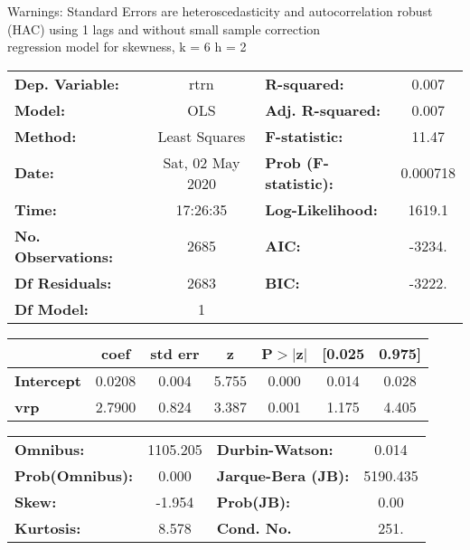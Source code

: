 Warnings: \newline
 [1] Standard Errors are heteroscedasticity and autocorrelation robust (HAC) using 1 lags and without small sample correction\\ 

regression model for skewness, k = 6 h = 2\begin{center}
\begin{tabular}{lclc}
\toprule
\textbf{Dep. Variable:}    &       rtrn       & \textbf{  R-squared:         } &     0.007   \\
\textbf{Model:}            &       OLS        & \textbf{  Adj. R-squared:    } &     0.007   \\
\textbf{Method:}           &  Least Squares   & \textbf{  F-statistic:       } &     11.47   \\
\textbf{Date:}             & Sat, 02 May 2020 & \textbf{  Prob (F-statistic):} &  0.000718   \\
\textbf{Time:}             &     17:26:35     & \textbf{  Log-Likelihood:    } &    1619.1   \\
\textbf{No. Observations:} &        2685      & \textbf{  AIC:               } &    -3234.   \\
\textbf{Df Residuals:}     &        2683      & \textbf{  BIC:               } &    -3222.   \\
\textbf{Df Model:}         &           1      & \textbf{                     } &             \\
\bottomrule
\end{tabular}
\begin{tabular}{lcccccc}
                   & \textbf{coef} & \textbf{std err} & \textbf{z} & \textbf{P$> |$z$|$} & \textbf{[0.025} & \textbf{0.975]}  \\
\midrule
\textbf{Intercept} &       0.0208  &        0.004     &     5.755  &         0.000        &        0.014    &        0.028     \\
\textbf{vrp}       &       2.7900  &        0.824     &     3.387  &         0.001        &        1.175    &        4.405     \\
\bottomrule
\end{tabular}
\begin{tabular}{lclc}
\textbf{Omnibus:}       & 1105.205 & \textbf{  Durbin-Watson:     } &    0.014  \\
\textbf{Prob(Omnibus):} &   0.000  & \textbf{  Jarque-Bera (JB):  } & 5190.435  \\
\textbf{Skew:}          &  -1.954  & \textbf{  Prob(JB):          } &     0.00  \\
\textbf{Kurtosis:}      &   8.578  & \textbf{  Cond. No.          } &     251.  \\
\bottomrule
\end{tabular}
\end{center}

